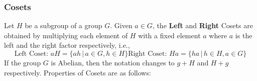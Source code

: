 \documentclass[a4paper, 12pt]{article}
\numberwithin{equation}{section}
\begin{document}
\subsubsection{Cosets}
Let $H$ be a subgroup of a group $G$. Given $a \in G$, the \textbf{Left} and \textbf{Right} Cosets are obtained by multiplying each element of $H$ with a fixed element $a$ where $a$ is the left and the right factor respectively, i.e.,
\begin{subequations}
\begin{equation}
\text{Left Coset: } aH = \{ ah \,| \, a \in G, h \in H \}
\end{equation}
\begin{equation}
\text{Right Coset: } Ha = \{ ha \,| \, h \in H, a \in G \}
\end{equation}
\end{subequations}
If the group $G$ is Abelian, then the notation changes to $g + H$ and $H + g$ respectively. Properties of Cosets are as follows:
\end{document}
